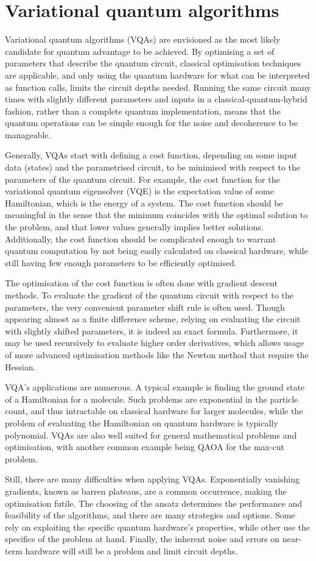 \section{Variational quantum algorithms}
\label{sec:vqa}
Variational quantum algorithms (VQAs) are envisioned as the most likely candidate for quantum advantage to be achieved.
By optimising a set of parameters that describe the quantum circuit, classical optimisation techniques are applicable, and only using the quantum hardware for what can be interpreted as function calls, limits the circuit depths needed.
Running the same circuit many times with slightly different parameters and inputs in a classical-quantum-hybrid fashion, rather than a complete quantum implementation, means that the quantum operations can be simple enough for the noise and decoherence to be manageable.

Generally, VQAs start with defining a cost function, depending on some input data (states) and the parametrised circuit, to be minimised with respect to the parameters of the quantum circuit.
For example, the cost function for the variational quantum eigensolver (VQE) is the expectation value of some Hamiltonian, which is the energy of a system.
The cost function should be meaningful in the sense that the minimum coincides with the optimal solution to the problem, and that lower values generally implies better solutions.
Additionally, the cost function should be complicated enough to warrant quantum computation by not being easily calculated on classical hardware, while still having few enough parameters to be efficiently optimised.

The optimisation of the cost function is often done with gradient descent methods.
To evaluate the gradient of the quantum circuit with respect to the parameters, the very convenient parameter shift rule is often used.
Though appearing almost as a finite difference scheme, relying on evaluating the circuit with slightly shifted parameters, it is indeed an exact formula.
Furthermore, it may be used recursively to evaluate higher order derivatives, which allows usage of more advanced optimisation methods like the Newton method that require the Hessian.

VQA's applications are numerous.
A typical example is finding the ground state of a Hamiltonian for a molecule.
Such problems are exponential in the particle count, and thus intractable on classical hardware for larger molecules, while the problem of evaluating the Hamiltonian on quantum hardware is typically polynomial.
VQAs are also well suited for general mathematical problems and optimisation, with another common example being QAOA for the max-cut problem.

Still, there are many difficulties when applying VQAs.
Exponentially vanishing gradients, known as barren plateaus, are a common occurrence, making the optimisation futile.
The choosing of the ansatz determines the performance and feasibility of the algorithms, and there are many strategies and options.
Some rely on exploiting the specific quantum hardware's properties, while other use the specifics of the problem at hand.
Finally, the inherent noise and errors on near-term hardware will still be a problem and limit circuit depths.